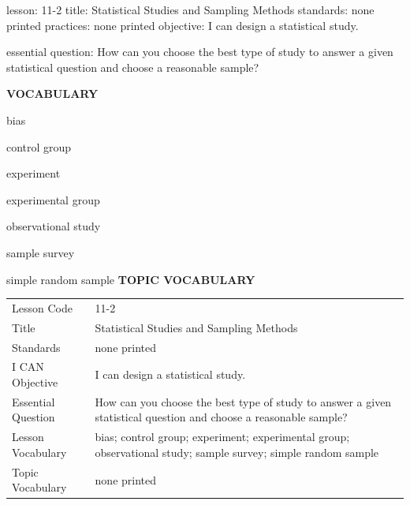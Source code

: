 \documentclass{article}
\newenvironment{lesson-meta}{}{}        %
\newcommand{\te}[1]{}                   %
\begin{document}
\begin{lesson-meta}
lesson: 11-2
title: Statistical Studies and Sampling Methods
standards: none printed
practices: none printed
objective: I can design a statistical study.

essential question: How can you choose the best type of study to answer a given statistical question and choose a reasonable sample?

\textbf{VOCABULARY}
\item bias
\item control group
\item experiment
\item experimental group
\item observational study
\item sample survey
\item simple random sample
\textbf{TOPIC VOCABULARY}
\te{No separate topic vocabulary list is printed on these pages.}
\begin{tabular}{ll}
Lesson Code & 11-2 \\
Title & Statistical Studies and Sampling Methods \\
Standards & none printed \\
I CAN Objective & I can design a statistical study. \\
Essential Question & How can you choose the best type of study to answer a given statistical question and choose a reasonable sample? \\
Lesson Vocabulary & bias; control group; experiment; experimental group; observational study; sample survey; simple random sample \\
Topic Vocabulary & none printed \\
\end{tabular}
\end{lesson-meta}
\end{document}
